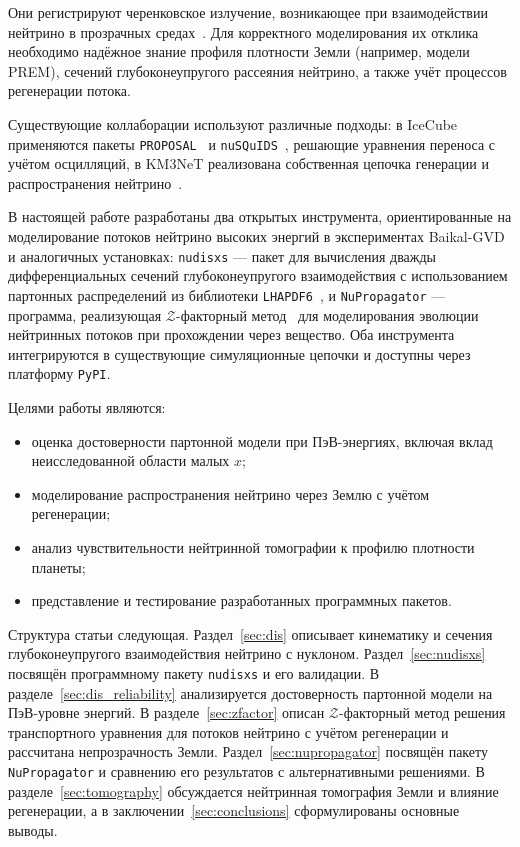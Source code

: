 Они регистрируют черенковское излучение, возникающее при взаимодействии нейтрино в прозрачных средах~\cite{Troitskii:2024}. Для корректного моделирования их отклика необходимо надёжное знание профиля плотности Земли (например, модели PREM), сечений глубоконеупругого рассеяния нейтрино, а также учёт процессов регенерации потока.

Существующие коллаборации используют различные подходы: в IceCube применяются пакеты \texttt{PROPOSAL}~\cite{Koehne:2013gpa} и \texttt{nuSQuIDS}~\cite{ARGUELLES2022108346}, решающие уравнения переноса с учётом осцилляций, в KM3NeT реализована собственная цепочка генерации и распространения нейтрино~\cite{ARGUELLES2022108346}.  

В настоящей работе разработаны два открытых инструмента, ориентированные на моделирование потоков нейтрино высоких энергий в экспериментах Baikal-GVD и аналогичных установках:  
\texttt{nudisxs} — пакет для вычисления дважды дифференциальных сечений глубоконеупругого взаимодействия с использованием партонных распределений из библиотеки \texttt{LHAPDF6}~\cite{Buckley_2015},  
и \texttt{NuPropagator} — программа, реализующая $\mathcal{Z}$-факторный метод~\cite{Naumov:1998sf} для моделирования эволюции нейтринных потоков при прохождении через вещество.  
Оба инструмента интегрируются в существующие симуляционные цепочки и доступны через платформу \texttt{PyPI}.  

Целями работы являются:
\begin{itemize}
    \item оценка достоверности партонной модели при ПэВ-энергиях, включая вклад неисследованной области малых $x$;
    \item моделирование распространения нейтрино через Землю с учётом регенерации;
    \item анализ чувствительности нейтринной томографии к профилю плотности планеты;
    \item представление и тестирование разработанных программных пакетов.
\end{itemize}

Структура статьи следующая.  
Раздел~\ref{sec:dis} описывает кинематику и сечения глубоконеупругого взаимодействия нейтрино с нуклоном.  
Раздел~\ref{sec:nudisxs} посвящён программному пакету \texttt{nudisxs} и его валидации.  
В разделе~\ref{sec:dis_reliability} анализируется достоверность партонной модели на ПэВ-уровне энергий.  
В разделе~\ref{sec:zfactor} описан $\mathcal{Z}$-факторный метод решения транспортного уравнения для потоков нейтрино с учётом регенерации и рассчитана непрозрачность Земли.  
Раздел~\ref{sec:nupropagator} посвящён пакету \texttt{NuPropagator} и сравнению его результатов с альтернативными решениями.  
В разделе~\ref{sec:tomography} обсуждается нейтринная томография Земли и влияние регенерации, а в заключении~\ref{sec:conclusions} сформулированы основные выводы.
